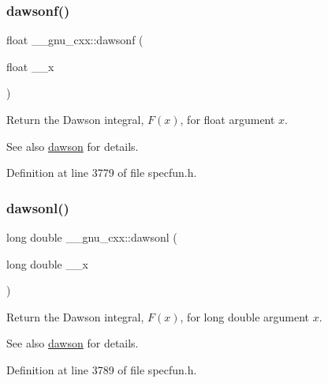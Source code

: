 \subsubsection{\texorpdfstring{dawsonf()}{dawsonf()}}
{\footnotesize\ttfamily float \+\_\+\+\_\+gnu\+\_\+cxx\+::dawsonf (\begin{DoxyParamCaption}\item[{float}]{\+\_\+\+\_\+x }\end{DoxyParamCaption})\hspace{0.3cm}{\ttfamily [inline]}}

Return the Dawson integral, $ F(x) $, for {\ttfamily float} argument $ x $.

\begin{DoxySeeAlso}{See also}
\hyperlink{group__gnu__math__spec__func_gabc97cbc04fdd23593e8dccbc1421dad5}{dawson} for details. 
\end{DoxySeeAlso}


Definition at line 3779 of file specfun.\+h.

\mbox{\label{group__gnu__math__spec__func_ga6647a7444ff9c7c1f2a8ed36761bfeb2}} 
\subsubsection{\texorpdfstring{dawsonl()}{dawsonl()}}
{\footnotesize\ttfamily long double \+\_\+\+\_\+gnu\+\_\+cxx\+::dawsonl (\begin{DoxyParamCaption}\item[{long double}]{\+\_\+\+\_\+x }\end{DoxyParamCaption})\hspace{0.3cm}{\ttfamily [inline]}}

Return the Dawson integral, $ F(x) $, for {\ttfamily long double} argument $ x $.

\begin{DoxySeeAlso}{See also}
\hyperlink{group__gnu__math__spec__func_gabc97cbc04fdd23593e8dccbc1421dad5}{dawson} for details. 
\end{DoxySeeAlso}


Definition at line 3789 of file specfun.\+h.

\mbox{\label{group__gnu__math__spec__func_ga0b14de47c011de3ebf771c9f29b2b78c}} 

